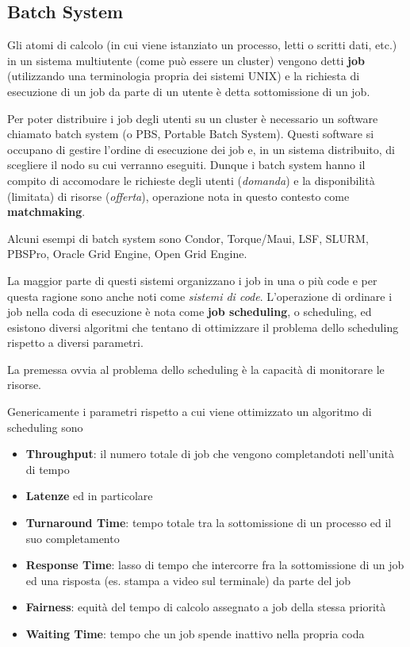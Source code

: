\documentclass[italian,]{article}
\begin{document}
\subsection{Batch System}\label{batch-system}

Gli atomi di calcolo (in cui viene istanziato un processo, letti o
scritti dati, etc.) in un sistema multiutente (come può essere un
cluster) vengono detti \textbf{job} (utilizzando una terminologia
propria dei sistemi UNIX) e la richiesta di esecuzione di un job da
parte di un utente è detta sottomissione di un job.

Per poter distribuire i job degli utenti su un cluster è necessario un
software chiamato batch system (o PBS, Portable Batch System). Questi
software si occupano di gestire l'ordine di esecuzione dei job e, in un
sistema distribuito, di scegliere il nodo su cui verranno eseguiti.
Dunque i batch system hanno il compito di accomodare le richieste degli
utenti (\emph{domanda}) e la disponibilità (limitata) di risorse
(\emph{offerta}), operazione nota in questo contesto come
\textbf{matchmaking}.

Alcuni esempi di batch system sono Condor, Torque/Maui, LSF, SLURM,
PBSPro, Oracle Grid Engine, Open Grid Engine.

La maggior parte di questi sistemi organizzano i job in una o più code e
per questa ragione sono anche noti come \emph{sistemi di code}.
L'operazione di ordinare i job nella coda di esecuzione è nota come
\textbf{job scheduling}, o scheduling, ed esistono diversi algoritmi che
tentano di ottimizzare il problema dello scheduling rispetto a diversi
parametri.

La premessa ovvia al problema dello scheduling è la capacità di
monitorare le risorse.

Genericamente i parametri rispetto a cui viene ottimizzato un algoritmo
di scheduling sono

\begin{itemize}
\item
  \textbf{Throughput}: il numero totale di job che vengono completandoti
  nell'unità di tempo
\item
  \textbf{Latenze} ed in particolare
\item
  \textbf{Turnaround Time}: tempo totale tra la sottomissione di un
  processo ed il suo completamento
\item
  \textbf{Response Time}: lasso di tempo che intercorre fra la
  sottomissione di un job ed una risposta (es. stampa a video sul
  terminale) da parte del job
\item
  \textbf{Fairness}: equità del tempo di calcolo assegnato a job della
  stessa priorità
\item
  \textbf{Waiting Time}: tempo che un job spende inattivo nella propria
  coda
\end{itemize}
\end{document}
